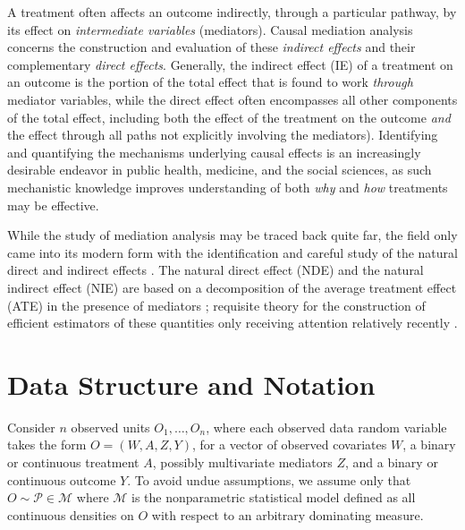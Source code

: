 \documentclass[
  12pt, krantz2,
]{krantz}
\theoremstyle{definition}
\theoremstyle{definition}
\theoremstyle{definition}
\newcommand{\M}{\mathcal{M}}
\newcommand{\1}{\mathbbm{1}}
\begin{document}
A treatment often affects an outcome indirectly, through a particular pathway,
by its effect on \emph{intermediate variables} (mediators). Causal mediation analysis
concerns the construction and evaluation of these \emph{indirect effects} and their
complementary \emph{direct effects}. Generally, the indirect effect (IE) of a
treatment on an outcome is the portion of the total effect that is found to work
\emph{through} mediator variables, while the direct effect often encompasses all
other components of the total effect, including both the effect of the treatment
on the outcome \emph{and} the effect through all paths not explicitly involving the
mediators). Identifying and quantifying the mechanisms underlying causal effects
is an increasingly desirable endeavor in public health, medicine, and the social
sciences, as such mechanistic knowledge improves understanding of both \emph{why} and
\emph{how} treatments may be effective.

While the study of mediation analysis may be traced back quite far, the field
only came into its modern form with the identification and careful study of the
natural direct and indirect effects \citep{robins1992identifiability, pearl2001direct}. The natural direct effect (NDE) and the natural indirect
effect (NIE) are based on a decomposition of the average treatment effect (ATE)
in the presence of mediators \citep{vanderweele2015explanation}; requisite
theory for the construction of efficient estimators of these quantities only
receiving attention relatively recently \citep{tchetgen2012semiparametric}.

\hypertarget{data-structure-and-notation-2}{%
\section{Data Structure and Notation}\label{data-structure-and-notation-2}}

Consider \(n\) observed units \(O_1, \ldots, O_n\), where each observed data random
variable takes the form \(O = (W, A, Z, Y)\), for a vector of observed covariates
\(W\), a binary or continuous treatment \(A\), possibly multivariate mediators \(Z\),
and a binary or continuous outcome \(Y\). To avoid undue assumptions, we assume
only that \(O \sim \mathcal{P} \in \M\) where \(\M\) is the nonparametric
statistical model defined as all continuous densities on \(O\) with respect to an
arbitrary dominating measure.
\end{document}
